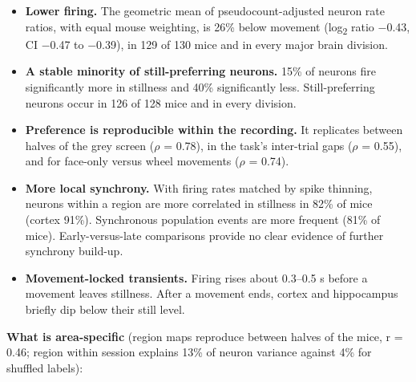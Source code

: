 \documentclass[10pt,a4paper]{article}
\begin{document}
\begin{itemize}
\item \textbf{Lower firing.} The geometric mean of pseudocount-adjusted neuron rate ratios, with equal mouse weighting, is 26\% below movement (log\textsubscript{2} ratio $-$0.43, CI $-$0.47 to $-$0.39), in 129 of 130 mice and in every major brain division.
\item \textbf{A stable minority of still-preferring neurons.} 15\% of neurons fire significantly more in stillness and 40\% significantly less. Still-preferring neurons occur in 126 of 128 mice and in every division.
\item \textbf{Preference is reproducible within the recording.} It replicates between halves of the grey screen ($\rho$ = 0.78), in the task's inter-trial gaps ($\rho$ = 0.55), and for face-only versus wheel movements ($\rho$ = 0.74).
\item \textbf{More local synchrony.} With firing rates matched by spike thinning, neurons within a region are more correlated in stillness in 82\% of mice (cortex 91\%). Synchronous population events are more frequent (81\% of mice). Early-versus-late comparisons provide no clear evidence of further synchrony build-up.
\item \textbf{Movement-locked transients.} Firing rises about 0.3--0.5 s before a movement leaves stillness. After a movement ends, cortex and hippocampus briefly dip below their still level.
\end{itemize}
\textbf{What is area-specific} (region maps reproduce between halves of the mice, r = 0.46; region within session explains 13\% of neuron variance against 4\% for shuffled labels):
\end{document}
